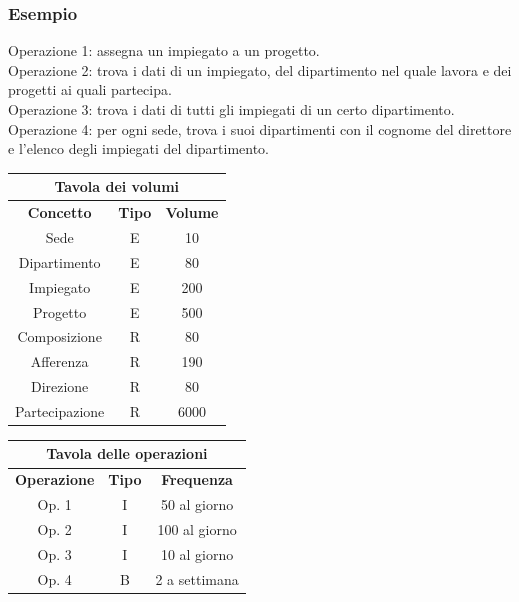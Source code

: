\documentclass[../main.tex]{subfiles}
\begin{document}
	\subsubsection{Esempio}
	Operazione 1: assegna un impiegato a un progetto.\\
	Operazione 2: trova i dati di un impiegato, del dipartimento nel quale lavora e dei progetti ai quali partecipa.\\
	Operazione 3: trova i dati di tutti gli impiegati di un certo dipartimento.\\
	Operazione 4: per ogni sede, trova i suoi dipartimenti con il cognome del direttore e l'elenco degli impiegati del dipartimento.
	\begin{center}
		\begin{tabular}{|c|c|c|}
			\hline
			\multicolumn{3}{|c|}{\textbf{Tavola dei volumi}}\\
			\hline
			\textbf{Concetto} & \textbf{Tipo} & \textbf{Volume} \\
			\hline
			Sede & E & 10\\
			\hline
			Dipartimento & E & 80\\
			\hline
			Impiegato & E & 200\\
			\hline
			Progetto & E & 500\\
			\hline
			Composizione & R & 80\\
			\hline
			Afferenza & R & 190\\
			\hline
			Direzione & R & 80\\
			\hline
			Partecipazione & R & 6000\\
			\hline
		\end{tabular}
		\begin{tabular}{|c|c|c|}
			\hline
			\multicolumn{3}{|c|}{\textbf{Tavola delle operazioni}}\\
			\hline
			\textbf{Operazione} & \textbf{Tipo} & \textbf{Frequenza} \\
			\hline
			Op. 1 & I & 50 al giorno \\
			\hline
			Op. 2 & I & 100 al giorno \\
			\hline
			Op. 3 & I & 10 al giorno \\
			\hline
			Op. 4 & B & 2 a settimana \\
			\hline
		\end{tabular}
	\end{center}
\end{document}

